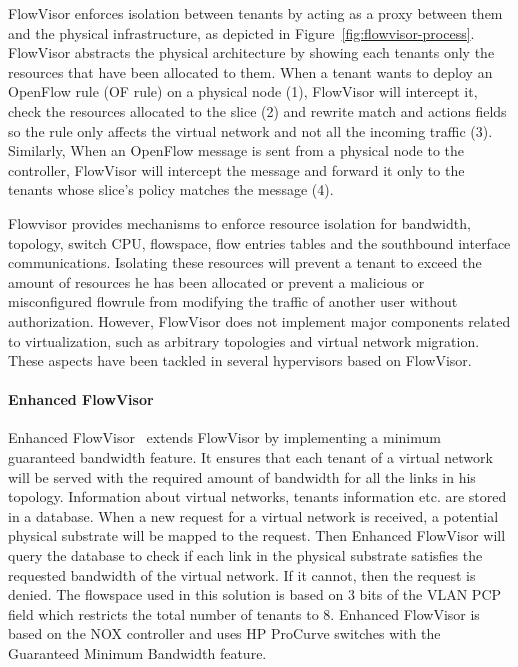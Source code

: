 FlowVisor enforces isolation between tenants by acting as a proxy between them and the physical infrastructure, as depicted in Figure~\ref{fig:flowvisor-process}.
FlowVisor abstracts the physical architecture by showing each tenants only the resources that have been allocated to them.
When a tenant wants to deploy an OpenFlow rule (OF rule) on a physical node (1), FlowVisor will intercept it, check the resources allocated to the slice (2) and rewrite match and actions fields so the rule only affects the virtual network and not all the incoming traffic (3).
Similarly, When an OpenFlow message is sent from a physical node to the controller, FlowVisor will intercept the message and forward it only to the tenants whose slice's policy matches the message (4).

Flowvisor provides mechanisms to enforce resource isolation for bandwidth, topology, switch CPU, flowspace, flow entries tables and the southbound interface communications. 
Isolating these resources will prevent a tenant to exceed the amount of resources he has been allocated or prevent a malicious or misconfigured flowrule from modifying the traffic of another user without authorization.
However, FlowVisor does not implement major components related to virtualization, such as arbitrary topologies and virtual network migration.
These aspects have been tackled in several hypervisors based on FlowVisor.

\paragraph{Enhanced FlowVisor}
Enhanced FlowVisor~\cite{EnhancedFV-Min2012} extends FlowVisor by implementing a minimum guaranteed bandwidth feature. It ensures that each tenant of a virtual network will be served with the required amount of bandwidth for all the links in his topology. Information about virtual networks, tenants information etc. are stored in a database. When a new request for a virtual network is received, a potential physical substrate will be mapped to the request. Then Enhanced FlowVisor will query the database to check if each link in the physical substrate satisfies the requested bandwidth of the virtual network. If it cannot, then the request is denied. 
The flowspace used in this solution is based on 3 bits of the VLAN PCP field which restricts the total number of tenants to 8.
Enhanced FlowVisor is based on the NOX controller and uses HP ProCurve switches with the Guaranteed Minimum Bandwidth feature.

